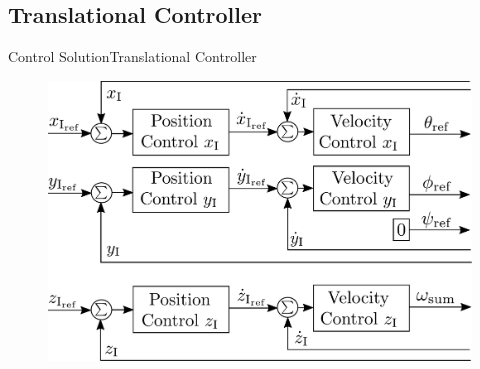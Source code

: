 \subsection{Translational Controller}

\begin{frame}{Control Solution}{Translational Controller}
  \begin{figure}[H]
      \includegraphics[width=.8\textwidth]{figures/TranslationalControlDiagramSmall}
  \end{figure}      
\end{frame}


